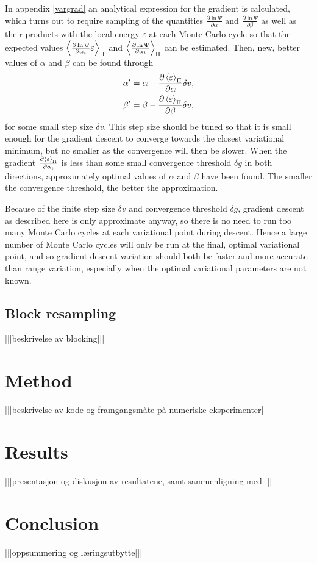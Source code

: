 \documentclass[a4paper,8pt]{article}
\begin{document}
\begin{multicols}{2}
In appendix \ref{vargrad} an analytical expression for the gradient is calculated, which turns out to require sampling of the quantities $\frac{\partial\ln\Psi}{\partial\alpha}$ and $\frac{\partial\ln\Psi}{\partial\beta}$ as well as their products with the local energy $\varepsilon$ at each Monte Carlo cycle so that the expected values $\ev{\frac{\partial\ln\Psi}{\partial\alpha_i}\varepsilon}_\Pi$ and $\ev{\frac{\partial\ln\Psi}{\partial\alpha_i}}_\Pi$ can be estimated. Then, new, better values of $\alpha$ and $\beta$ can be found through
\begin{align}
\alpha' &= \alpha-\frac{\partial\ev{\varepsilon}_\Pi}{\partial\alpha}\delta v, \\
\beta' &= \beta-\frac{\partial\ev{\varepsilon}_\Pi}{\partial\beta}\delta v,
\end{align}
for some small step size $\delta v$. This step size should be tuned so that it is small enough for the gradient descent to converge towards the closest variational minimum, but no smaller as the convergence will then be slower. When the gradient $\frac{\partial\ev{\varepsilon}_\Pi}{\partial\alpha_i}$ is less than some small convergence threshold $\delta g$ in both directions, approximately optimal values of $\alpha$ and $\beta$ have been found. The smaller the convergence threshold, the better the approximation.

Because of the finite step size $\delta v$ and convergence threshold $\delta g$, gradient descent as described here is only approximate anyway, so there is no need to run too many Monte Carlo cycles at each variational point during descent. Hence a large number of Monte Carlo cycles will only be run at the final, optimal variational point, and so gradient descent variation should both be faster and more accurate than range variation, especially when the optimal variational parameters are not known.

\subsection{Block resampling}
|||beskrivelse av blocking|||


\section{Method} \label{method}

|||beskrivelse av kode og framgangsmåte på numeriske eksperimenter||


\section{Results} \label{results}

|||presentasjon og diskusjon av resultatene, samt sammenligning med \cite{SWL}|||


\section{Conclusion}

|||oppsummering og læringsutbytte|||


\end{multicols}


\end{document}
